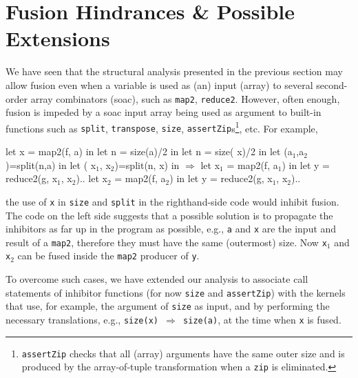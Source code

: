 \documentclass{sigplanconf}  %
\newcommand{\emp}[1]{\textcolor{DikuRed}{ #1}}
\newcommand{\emphh}[1]{\textcolor{CosGreen}{ #1}}
\newcommand{\mymath}[1]{$ #1 $}
\newcommand{\myindx}[1]{_{#1}}
\begin{document}
\section{Fusion Hindrances \& Possible Extensions}
\label{sec:Discuss}

We have seen that the structural analysis presented in the previous section
may allow fusion even when a variable is used as (an) input (array) to several
second-order array combinators ({\sc soac}), such as {\tt map2}, {\tt reduce2}.
However, often enough, fusion is impeded by a {\sc soac} input array being
used as argument to built-in functions such as {\tt split}, {\tt transpose},
{\tt size}, {\tt assertZip}s\footnote{
{\tt assertZip} checks that all (array) arguments have the same outer size 
and is produced by the array-of-tuple transformation when a {\tt zip} is
eliminated.
}, etc.   For example,
\begin{colorcode}
let \emphh{x} = map2(f, a)      in    let n = size(a)/2      in
let n = size(\emp{x})/2       in    let (a\mymath{\myindx{1}},a\mymath{\myindx{2}})=split(n,a) in 
let (\emphh{x\mymath{\myindx{1}}},\emphh{x\mymath{\myindx{2}}})=split(n,\emp{x})  in \mymath{\Rightarrow} let \emphh{x\mymath{\myindx{1}}} = map2(f, a\mymath{\myindx{1}})   in
let y = reduce2(g,\emphh{x\mymath{\myindx{1}}},\emphh{x\mymath{\myindx{2}}})..    let \emphh{x\mymath{\myindx{2}}} = map2(f, a\mymath{\myindx{2}})   in
                              let y = reduce2(g,\emphh{x\mymath{\myindx{1}}},\emphh{x\mymath{\myindx{2}}})..
\end{colorcode}
the use of {\tt x} in {\tt size} and {\tt split} in the righthand-side code 
would inhibit fusion.
The code on the left side suggests that a possible solution is to propagate 
the inhibitors as far up in the program as possible, e.g., {\tt a} and {\tt x} 
are the input and result of a {\tt map2}, therefore they must have the same 
(outermost) size. Now {\tt x$_1$} and {\tt x$_2$} can be fused inside the 
{\tt map2} producer of {\tt y}.

To overcome such cases, we have extended our analysis to associate
call statements of inhibitor functions (for now {\tt size} and {\tt assertZip})
with the kernels that use, for example, the argument of {\tt size} 
as input, and by performing the necessary translations, e.g., 
{\tt size(x) $\Rightarrow$ size(a)}, at the time when {\tt x} is fused.

\end{document}
